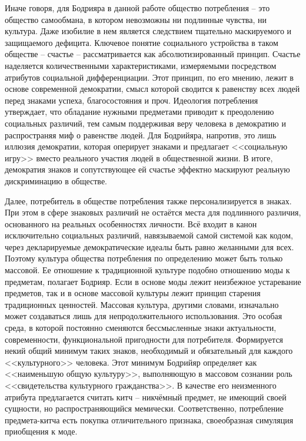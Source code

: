 Иначе говоря, для Бодрияра в данной работе общество потребления -- это общество
самообмана, в котором невозможны ни подлинные чувства, ни культура.
Даже изобилие в нем является следствием тщательно маскируемого и защищаемого дефицита.
Ключевое понятие социального устройства в таком обществе -- счастье --
рассматривается как абсолютизированный принцип. Счастье наделяется количественными
характеристиками, измеряемыми посредством атрибутов социальной дифференциации.
Этот принцип, по его мнению, лежит в основе современной демократии, смысл которой
сводится к равенству всех людей перед знаками успеха, благосостояния и проч.
Идеология потребления утверждает, что обладание нужными предметами приводит к
преодолению социальных различий, тем самым поддерживая веру человека в демократию и
распространяя миф о равенстве людей. Для Бодрийяра, напротив, это лишь иллюзия
демократии, которая оперирует знаками и предлагает <<социальную игру>>
вместо реального участия людей в общественной жизни. В итоге, демократия знаков и
сопутствующее ей счастье эффектно маскируют реальную дискриминацию в обществе.
\autocite[][73--116]{bodriyar_society}

Далее, потребитель в обществе потребления также персонализируется в знаках.
При этом в сфере знаковых различий не остаётся места для подлинного различия,
основанного на реальных особенностях личности. Всё входит в канон исключительно
социальных различий, навязываемой самой системой как кодом, через декларируемые
демократические идеалы быть равно желанными для всех. \autocite[][117--128]{bodriyar_society}
Поэтому культура общества потребления по определению может быть только массовой. Ее отношение
к традиционной культуре подобно отношению моды к предметам, полагает Бодрияр.
Если в основе моды лежит неизбежное устаревание предметов, так и в основе массовой
культуры лежит принцип старения традиционных ценностей. Массовая культура, другими
словами, изначально может создаваться лишь для непродолжительного использования.
Это особая среда, в которой постоянно сменяются бессмысленные знаки актуальности,
современности, функциональной пригодности для потребителя. Формируется некий общий
минимум таких знаков, необходимый и обязательный для каждого <<культурного>> человека.
Этот минимум Бодрийяр определяет как <<наименьшую общую культуру>>,
выполняющую в массовом сознании роль <<свидетельства культурного гражданства>>.
\autocite[][136--143]{bodriyar_society} В качестве его неизменного атрибута предлагается считать
китч -- никчёмный предмет, не имеющий своей сущности, но распространяющийся
мемически. Соответственно, потребление предмета-китча есть покупка отличительного признака,
своеобразная симуляция приобщения к моде. \autocite[][144--146]{bodriyar_society}

